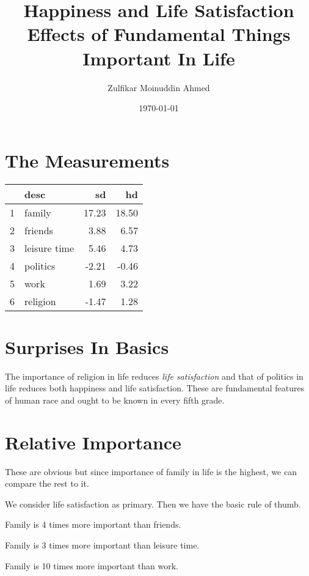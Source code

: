 \documentclass{amsart}
\title{Happiness and Life Satisfaction Effects of Fundamental Things Important In Life}
\author{Zulfikar Moinuddin Ahmed}
\date{\today}
\begin{document}
\maketitle

\section{The Measurements}

\begin{table}[ht]
\centering
\begin{tabular}{rlrr}
  \hline
 & desc & sd & hd \\ 
  \hline
1 & family & 17.23 & 18.50 \\ 
  2 & friends & 3.88 & 6.57 \\ 
  3 & leisure time & 5.46 & 4.73 \\ 
  4 & politics & -2.21 & -0.46 \\ 
  5 & work & 1.69 & 3.22 \\ 
  6 & religion & -1.47 & 1.28 \\ 
   \hline
\end{tabular}
\end{table}

\section{Surprises In Basics}

The importance of religion in life reduces {\em life satisfaction} and that of politics in life reduces both happiness and life satisfaction.  These are fundamental features of human race and ought to be known in every fifth grade.  

\section{Relative Importance}

These are obvious but since importance of family in life is the highest, we can compare the rest to it.  

We consider life satisfaction as primary.  Then we have the basic rule of thumb.

Family is 4 times more important than friends.

Family is 3 times more important than leisure time.

Family is 10 times more important than work.
\end{document}
